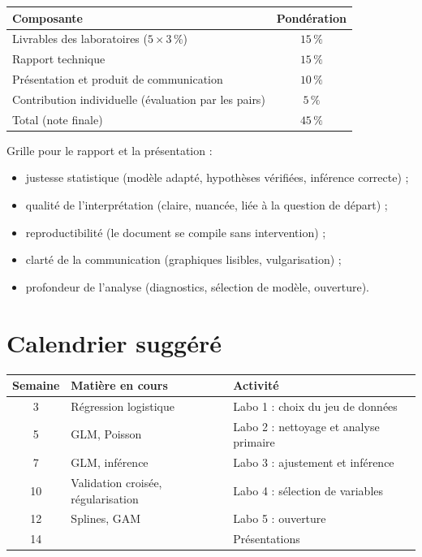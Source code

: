 \documentclass[11pt,letterpaper]{scrartcl}
\begin{document}
\begin{center}
\begin{tabular}{@{}lc@{}}
\toprule
Composante & Pondération \\
\midrule
Livrables des laboratoires ($5 \times 3\,\%$) & $15\,\%$ \\
Rapport technique & $15\,\%$ \\
Présentation et produit de communication & $10\,\%$ \\
Contribution individuelle (évaluation par les pairs) & $5\,\%$ \\
\midrule
Total (note finale) & $45\,\%$ \\
\bottomrule
\end{tabular}
\end{center}

Grille pour le rapport et la présentation :
\begin{itemize}
  \item justesse statistique (modèle adapté, hypothèses vérifiées, inférence correcte) ;
  \item qualité de l'interprétation (claire, nuancée, liée à la question de départ) ;
  \item reproductibilité (le document se compile sans intervention) ;
  \item clarté de la communication (graphiques lisibles, vulgarisation) ;
  \item profondeur de l'analyse (diagnostics, sélection de modèle, ouverture).
\end{itemize}

\section{Calendrier suggéré}

\begin{center}
\begin{tabular}{@{}cll@{}}
\toprule
Semaine & Matière en cours & Activité \\
\midrule
3  & Régression logistique & Labo 1 : choix du jeu de données \\
5  & GLM, Poisson & Labo 2 : nettoyage et analyse primaire \\
7  & GLM, inférence & Labo 3 : ajustement et inférence \\
10 & Validation croisée, régularisation & Labo 4 : sélection de variables \\
12 & Splines, GAM & Labo 5 : ouverture \\
14 & & Présentations \\
\bottomrule
\end{tabular}
\end{center}
\end{document}
